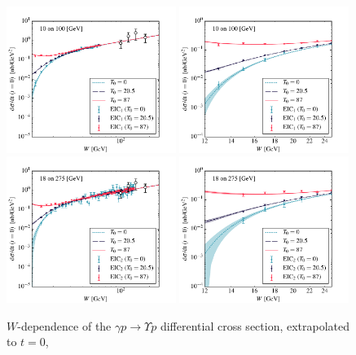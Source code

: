 \documentclass[prd,amsmath,twocolumn,floatfix,amssymb, preprintnumbers, linenumbers,nofootinbib, superscriptaddress]{revtex4}
\begin{document}
\begin{figure}
\includegraphics[width=0.49\textwidth]{dsdt_y_eic1.pdf}
\includegraphics[width=0.49\textwidth]{dsdt_y_close_eic1.pdf} \\
\includegraphics[width=0.49\textwidth]{dsdt_y_eic2.pdf}
\includegraphics[width=0.49\textwidth]{dsdt_y_close_eic2.pdf}
\caption{$W$-dependence of the $\gamma p \to \Upsilon p$ differential cross section, extrapolated to $t=0$, 
}
\end{figure}
\end{document}
